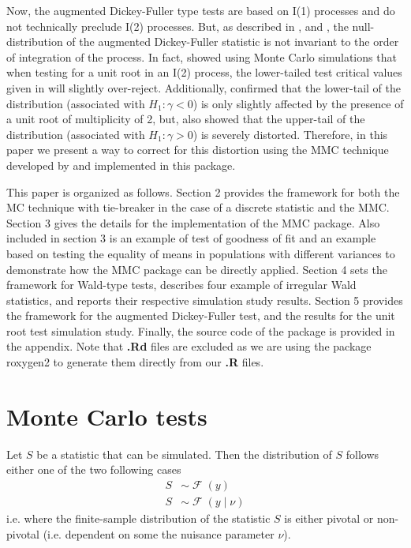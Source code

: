 \documentclass[]{article}\usepackage[]{graphicx}\usepackage[]{color}
\newcommand{\pkg}[1]{{\normalfont\fontseries{b}\selectfont #1}}
\DeclareMathOperator{\dist}{\mathcal{F}}
\begin{document}
Now, the augmented Dickey-Fuller type tests are based on I(1) processes and do not technically preclude I(2) processes. But, as described in \cite{david_a._dickey_determining_1987}, \cite{haldrup_robustness_2002} and \cite{pantula_testing_1989}, the null-distribution of the augmented Dickey-Fuller statistic is not invariant to the order of integration of the process. In fact, \cite{david_a._dickey_determining_1987} showed using Monte Carlo simulations that when testing for a unit root in an I(2) process, the lower-tailed test critical values given in \cite[Table 8.5.2]{fuller_introduction_1976} will slightly over-reject. Additionally,  \cite{haldrup_robustness_2002} confirmed that the lower-tail of the distribution (associated with $H_1: \gamma<0$) is only slightly affected by the presence of a unit root of multiplicity of 2, but, \cite{haldrup_robustness_2002} also showed that the upper-tail of the distribution (associated with $H_1: \gamma>0$) is severely distorted. Therefore, in this paper we present a way to correct for this distortion using the MMC technique developed by \cite{dufour_monte_2006} and implemented in this package.

This paper is organized as follows. Section 2 provides the framework for both the MC technique with tie-breaker in the case of a discrete statistic and the MMC. Section 3 gives the details for the implementation of the \pkg{MMC} package. Also included in section 3 is an example of test of goodness of fit and an example based on testing the equality of means in populations with different variances to demonstrate how the \pkg{MMC} package can be directly applied. Section 4 sets the framework for Wald-type tests, describes four example of irregular Wald statistics, and reports their respective simulation study results. Section 5 provides the framework for the augmented Dickey-Fuller test, and the results for the unit root test simulation study. Finally, the source code of the package is provided in the appendix. Note that \textbf{.Rd} files are excluded as we are using the package \pkg{roxygen2} \citep{wickham_roxygen2:_2015} to generate them directly from our \textbf{.R} files.

\section{Monte Carlo tests}

Let $S$ be a statistic that can be simulated. Then the distribution of $S$ follows either one of the two following cases
\begin{align}
S & \sim \dist(y) \\
S & \sim \dist(y \mid \nu)
\end{align}
i.e. where the finite-sample distribution of the statistic $S$ is either pivotal or non-pivotal (i.e. dependent on some the nuisance parameter $\nu$).
\end{document}
